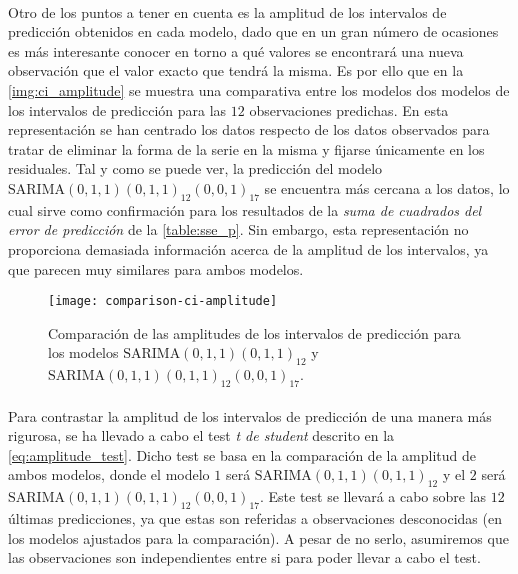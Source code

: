 \documentclass[a4paper, spanish]{article}
\begin{document}
    \paragraph{}
    Otro de los puntos a tener en cuenta es la amplitud de los intervalos de predicción obtenidos en cada modelo, dado que en un gran número de ocasiones es más interesante conocer en torno a qué valores se encontrará una nueva observación que el valor exacto que tendrá la misma. Es por ello que en la \autoref{img:ci_amplitude} se muestra una comparativa entre los modelos dos modelos de los intervalos de predicción para las $12$ observaciones predichas. En esta representación se han centrado los datos respecto de los datos observados para tratar de eliminar la forma de la serie en la misma y fijarse únicamente en los residuales. Tal y como se puede ver, la predicción del modelo $\text{SARIMA}(0, 1, 1)(0, 1, 1)_{12}(0, 0, 1)_{17}$ se encuentra más cercana a los datos, lo cual sirve como confirmación para los resultados de la \emph{suma de cuadrados del error de predicción} de la \autoref{table:sse_p}. Sin embargo, esta representación no proporciona demasiada información acerca de la amplitud de los intervalos, ya que parecen muy similares para ambos modelos.

    \begin{figure}[htb!]
      \centering
      \texttt{[image: comparison-ci-amplitude]}
      \caption{Comparación de las amplitudes de los intervalos de predicción para los modelos $\text{SARIMA}(0, 1, 1)(0, 1, 1)_{12}$ y $\text{SARIMA}(0, 1, 1)(0, 1, 1)_{12}(0, 0, 1)_{17}$.}
      \label{img:ci_amplitude}
    \end{figure}

    \paragraph{}
    Para contrastar la amplitud de los intervalos de predicción de una manera más rigurosa, se ha llevado a cabo el test \emph{t de student} descrito en la \autoref{eq:amplitude_test}. Dicho test se basa en la comparación de la amplitud de ambos modelos, donde el modelo $1$ será $\text{SARIMA}(0, 1, 1)(0, 1, 1)_{12}$ y el $2$ será $\text{SARIMA}(0, 1, 1)(0, 1, 1)_{12}(0, 0, 1)_{17}$. Este test se llevará a cabo sobre las $12$ últimas predicciones, ya que estas son referidas a observaciones desconocidas (en los modelos ajustados para la comparación). A pesar de no serlo, asumiremos que las observaciones son independientes entre si para poder llevar a cabo el test.
\end{document}
